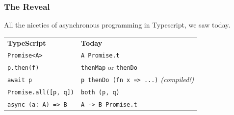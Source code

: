 \documentclass[aspectratio=169]{beamer}
\begin{document}
\begin{frame}[fragile]
  \frametitle{The Reveal}

  All the niceties of asynchronous programming in Typescript, we saw
  today.

  \begin{center}
  \begin{tabular}{ll}
    \textbf{TypeScript} & \textbf{Today} \\
    \texttt{Promise<A>} & \texttt{A Promise.t} \\
    \texttt{p.then(f)} & \texttt{thenMap} or \texttt{thenDo} \\
    \texttt{await p} & \texttt{p thenDo (fn x => ...)} \emph{(compiled!)} \\
    \texttt{Promise.all([p, q])} & \texttt{both (p, q)} \\
    \texttt{async (a: A) => B} & \texttt{A -> B Promise.t} \\
  \end{tabular}
  \end{center}
\end{frame}








\end{document}
